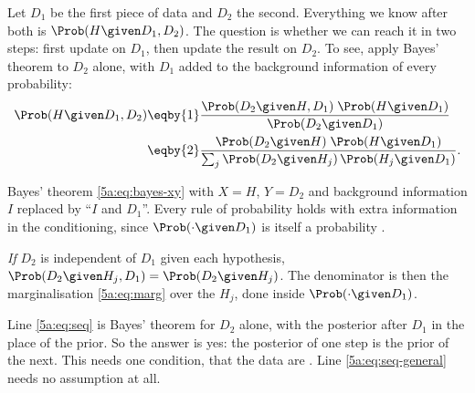 Let $D_1$ be the first piece of data and $D_2$ the second. Everything we know after
both is $\Prob(H\given D_1,D_2)$. The question is whether we can reach it in two
steps: first update on $D_1$, then update the result on $D_2$. To see, apply Bayes'
theorem to $D_2$ alone, with $D_1$ added to the background information of every
probability:
\begin{align}
  \Prob(H\given D_1,D_2)
  &\eqby{1}\frac{\Prob(D_2\given H,D_1)\;\Prob(H\given D_1)}{\Prob(D_2\given D_1)}
  \label{5a:eq:seq-general}\\
  &\eqby{2}\frac{\Prob(D_2\given H)\;\Prob(H\given D_1)}
               {\sum_j\Prob(D_2\given H_j)\,\Prob(H_j\given D_1)} .
  \label{5a:eq:seq}
\end{align}
\begin{explain}
  \item Bayes' theorem \eqref{5a:eq:bayes-xy} with $X=H$, $Y=D_2$ and background
        information $I$ replaced by ``$I$ and $D_1$''. Every rule of probability holds
        with extra information in the conditioning, since $\Prob(\cdot\given D_1)$ is
        itself a probability .
  \item \emph{If} $D_2$ is independent of $D_1$ given each hypothesis,
        $\Prob(D_2\given H_j,D_1)=\Prob(D_2\given H_j)$. The denominator is then the
        marginalisation \eqref{5a:eq:marg} over the $H_j$, done inside
        $\Prob(\cdot\given D_1)$.
\end{explain}
Line \eqref{5a:eq:seq} is Bayes' theorem for $D_2$ alone, with the posterior after
$D_1$ in the place of the prior. So the answer is yes: the posterior of one step is
the prior of the next. This needs one condition, that the data are
 . Line
\eqref{5a:eq:seq-general} needs no assumption at all.

